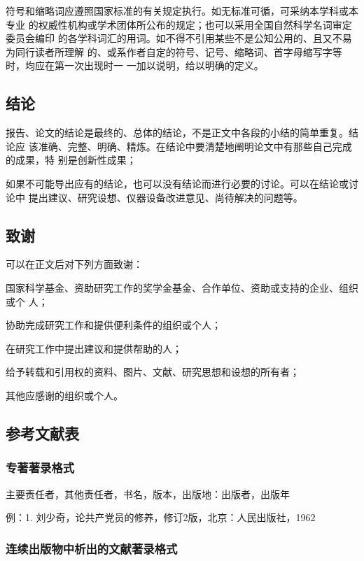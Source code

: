 \documentclass[oneside, phd]{njuthesis}
\begin{document}
符号和缩略词应遵照国家标准的有关规定执行。如无标准可循，可采纳本学科或本专业
的权威性机构或学术团体所公布的规定；也可以采用全国自然科学名词审定委员会编印
的各学科词汇的用词。如不得不引用某些不是公知公用的、且又不易为同行读者所理解
的、或系作者自定的符号、记号、缩略词、首字母缩写字等时，均应在第一次出现时一
一加以说明，给以明确的定义。

\subsection{结论}

报告、论文的结论是最终的、总体的结论，不是正文中各段的小结的简单重复。结论应
该准确、完整、明确、精炼。在结论中要清楚地阐明论文中有那些自己完成的成果，特
别是创新性成果；

如果不可能导出应有的结论，也可以没有结论而进行必要的讨论。可以在结论或讨论中
提出建议、研究设想、仪器设备改进意见、尚待解决的问题等。

\subsection{致谢}

可以在正文后对下列方面致谢：

国家科学基金、资助研究工作的奖学金基金、合作单位、资助或支持的企业、组织或个
人；

协助完成研究工作和提供便利条件的组织或个人；

在研究工作中提出建议和提供帮助的人；

给予转载和引用权的资料、图片、文献、研究思想和设想的所有者；

其他应感谢的组织或个人。

\subsection{参考文献表}

\subsubsection{专著著录格式}

主要责任者，其他责任者，书名，版本，出版地：出版者，出版年

例：1. 刘少奇，论共产党员的修养，修订2版，北京：人民出版社，1962

\subsubsection{连续出版物中析出的文献著录格式}
\end{document}
